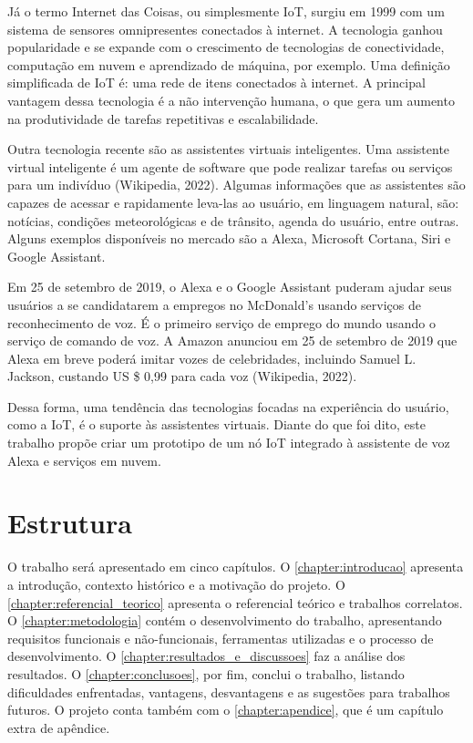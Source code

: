 Já o termo Internet das Coisas, ou simplesmente IoT, surgiu em 1999 com um sistema de sensores omnipresentes conectados à internet. A tecnologia ganhou popularidade e se expande com o crescimento de tecnologias de conectividade, computação em nuvem e aprendizado de máquina, por exemplo. Uma definição simplificada de IoT é: uma rede de itens conectados à internet. A principal vantagem dessa tecnologia é a não intervenção humana, o que gera um aumento na produtividade de tarefas repetitivas e escalabilidade.

Outra tecnologia recente são as assistentes virtuais inteligentes. Uma assistente virtual inteligente é um agente de software que pode realizar tarefas ou serviços para um indivíduo (Wikipedia, 2022). Algumas informações que as assistentes são capazes de acessar e rapidamente leva-las ao usuário, em linguagem natural, são: notícias, condições meteorológicas e de trânsito, agenda do usuário, entre outras. Alguns exemplos disponíveis no mercado são a Alexa, Microsoft Cortana, Siri e Google Assistant.

Em 25 de setembro de 2019, o Alexa e o Google Assistant puderam ajudar seus usuários a se candidatarem a empregos no McDonald's usando serviços de reconhecimento de voz. É o primeiro serviço de emprego do mundo usando o serviço de comando de voz. A Amazon anunciou em 25 de setembro de 2019 que Alexa em breve poderá imitar vozes de celebridades, incluindo Samuel L. Jackson, custando US \$ 0,99 para cada voz (Wikipedia, 2022).

Dessa forma, uma tendência das tecnologias focadas na experiência do usuário, como a IoT, é o suporte às assistentes virtuais. Diante do que foi dito, este trabalho propõe criar um prototipo de um nó IoT integrado à assistente de voz Alexa e serviços em nuvem.

\section{Estrutura}
O trabalho será apresentado em cinco capítulos. O \autoref{chapter:introducao} apresenta a introdução, contexto histórico e a motivação do projeto. O \autoref{chapter:referencial_teorico} apresenta o referencial teórico e trabalhos correlatos. O \autoref{chapter:metodologia} contém o desenvolvimento do trabalho, apresentando requisitos funcionais e não-funcionais, ferramentas utilizadas e o processo de desenvolvimento. O \autoref{chapter:resultados_e_discussoes} faz a análise dos resultados. O \autoref{chapter:conclusoes}, por fim, conclui o trabalho, listando dificuldades enfrentadas, vantagens, desvantagens e as sugestões para trabalhos futuros. O projeto conta também com o \autoref{chapter:apendice}, que é um capítulo extra de apêndice.
